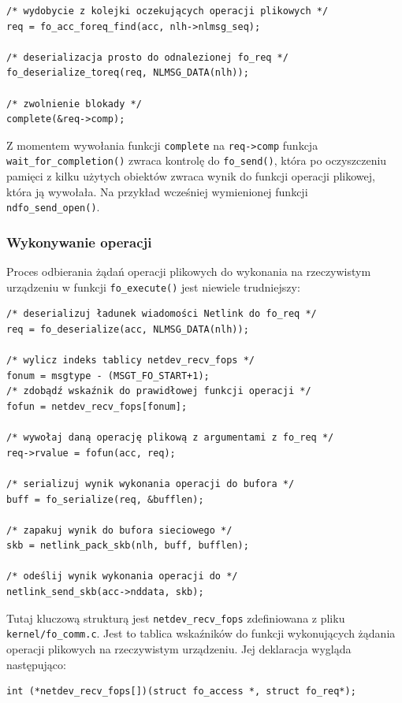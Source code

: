 \documentclass[11pt]{scrartcl}
\begin{document}
\begin{verbatim}
/* wydobycie z kolejki oczekujących operacji plikowych */
req = fo_acc_foreq_find(acc, nlh->nlmsg_seq);

/* deserializacja prosto do odnalezionej fo_req */
fo_deserialize_toreq(req, NLMSG_DATA(nlh));

/* zwolnienie blokady */
complete(&req->comp);
\end{verbatim}

Z momentem wywołania funkcji \texttt{complete} na \texttt{req-\textgreater{}comp} funkcja \texttt{wait\_for\_completion()} zwraca kontrolę do \texttt{fo\_send()}, która po oczyszczeniu pamięci z kilku użytych obiektów zwraca wynik do funkcji operacji plikowej, która ją wywołała. Na przykład wcześniej wymienionej funkcji \texttt{ndfo\_send\_open()}.

\subsubsection{Wykonywanie operacji}

Proces odbierania żądań operacji plikowych do wykonania na rzeczywistym urządzeniu w funkcji \texttt{fo\_execute()} jest niewiele trudniejszy:

\begin{verbatim}
/* deserializuj ładunek wiadomości Netlink do fo_req */
req = fo_deserialize(acc, NLMSG_DATA(nlh));

/* wylicz indeks tablicy netdev_recv_fops */
fonum = msgtype - (MSGT_FO_START+1);
/* zdobądź wskaźnik do prawidłowej funkcji operacji */
fofun = netdev_recv_fops[fonum];

/* wywołaj daną operację plikową z argumentami z fo_req */
req->rvalue = fofun(acc, req);

/* serializuj wynik wykonania operacji do bufora */
buff = fo_serialize(req, &bufflen);

/* zapakuj wynik do bufora sieciowego */
skb = netlink_pack_skb(nlh, buff, bufflen);

/* odeślij wynik wykonania operacji do */
netlink_send_skb(acc->nddata, skb);
\end{verbatim}

Tutaj kluczową strukturą jest \texttt{netdev\_recv\_fops} zdefiniowana z pliku \texttt{kernel/fo\_comm.c}. Jest to tablica wskaźników do funkcji wykonujących żądania operacji plikowych na rzeczywistym urządzeniu. Jej deklaracja wygląda następująco:

\begin{verbatim}
int (*netdev_recv_fops[])(struct fo_access *, struct fo_req*);
\end{verbatim}
\end{document}
